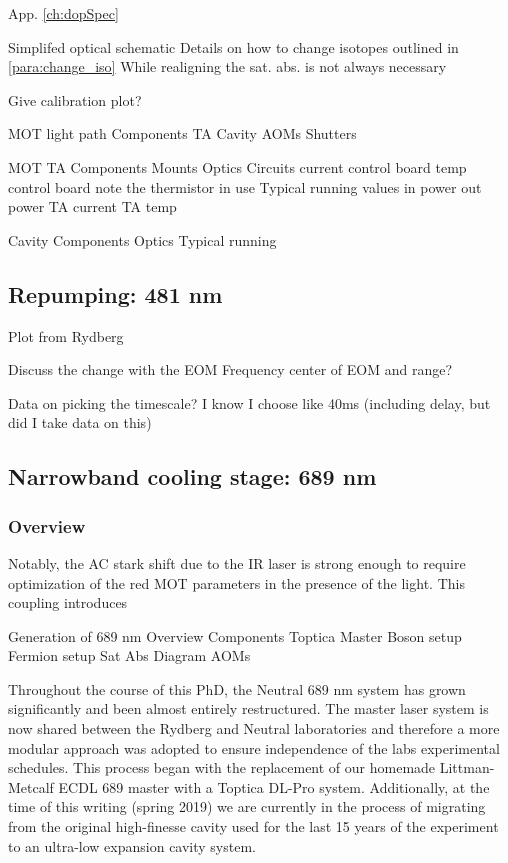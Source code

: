 App. \ref{ch:dopSpec}

Simplifed optical schematic
Details on how to change isotopes outlined in \ref{para:change_iso}
While realigning the sat. abs. is not always necessary

Give calibration plot?

MOT light path
	Components
		TA
		Cavity
		AOMs
		Shutters
	
	MOT TA
		Components
			Mounts
			Optics
			Circuits
				current control board
				temp control board
					note the thermistor in use
		Typical running values
			in power
			out power
			TA current
			TA temp
		
	Cavity
		Components
			Optics
		Typical running
		



\subsection{Repumping: 481 nm}
\label{ssec:481sys}

Plot from Rydberg

Discuss the change with the EOM
	Frequency center of EOM and range?
	
Data on picking the timescale?
	I know I choose like 40ms (including delay, but did I take data on this)


\subsection{Narrowband cooling stage: 689 nm} \label{ssec:689sys}
\subsubsection{Overview}

Notably, the AC stark shift due to the IR laser is strong enough to require optimization of the red MOT parameters  in the presence of the light.
This coupling introduces 

Generation of 689 nm
	Overview
	Components
		Toptica Master
		Boson setup
		Fermion setup
		Sat Abs
	Diagram
		AOMs
	
Throughout the course of this PhD, the Neutral 689 nm system has grown significantly and been almost entirely restructured. The master laser system is now shared between the Rydberg and Neutral laboratories and therefore a more modular approach was adopted to ensure independence of the labs experimental schedules. This process began with the replacement of our homemade Littman-Metcalf ECDL 689 master with a Toptica DL-Pro system. Additionally, at the time of this writing (spring 2019) we are currently in the process of migrating from the original high-finesse cavity used for the last 15 years \cite{Nagel2004} of the experiment to an ultra-low expansion cavity system. 


